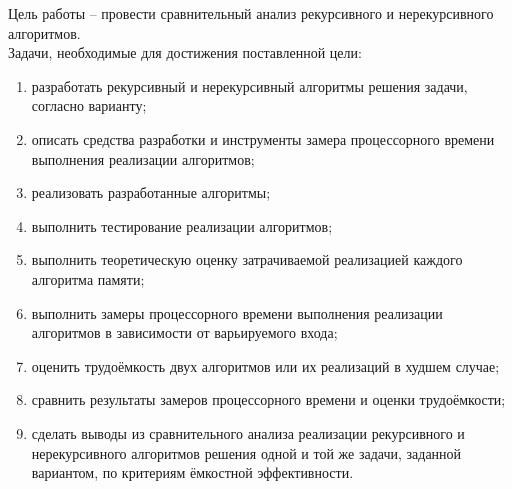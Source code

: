
Цель работы -- провести сравнительный анализ рекурсивного и нерекурсивного алгоритмов. \\

Задачи, необходимые для достижения поставленной цели:
\begin{enumerate}
	\item разработать рекурсивный и нерекурсивный алгоритмы решения задачи, согласно варианту;
	\item описать средства разработки и инструменты замера процессорного времени выполнения реализации алгоритмов;
	\item реализовать разработанные алгоритмы;
	\item выполнить тестирование реализации алгоритмов;
	\item выполнить теоретическую оценку затрачиваемой реализацией каждого алгоритма памяти;
	\item выполнить замеры процессорного времени выполнения реализации алгоритмов в зависимости от варьируемого входа;
	\item оценить трудоёмкость двух алгоритмов или их реализаций в худшем случае;
	\item сравнить результаты замеров процессорного времени и оценки трудоёмкости;
	\item сделать выводы из сравнительного анализа реализации рекурсивного и нерекурсивного алгоритмов решения одной и той же задачи, заданной вариантом, по критериям ёмкостной эффективности.
\end{enumerate}

\clearpage
